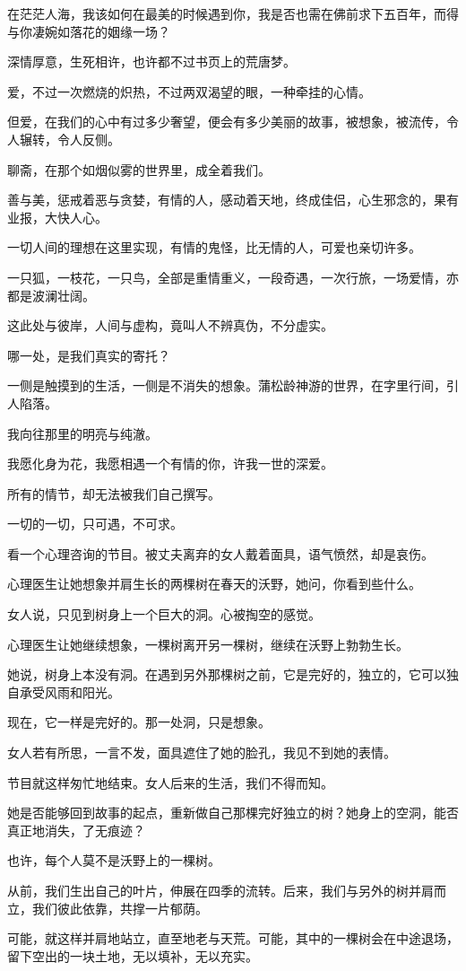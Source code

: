 		\vspace{1em}
		在茫茫人海，我该如何在最美的时候遇到你，我是否也需在佛前求下五百年，而得与你凄婉如落花的姻缘一场？\par
		深情厚意，生死相许，也许都不过书页上的荒唐梦。\par
		爱，不过一次燃烧的炽热，不过两双渴望的眼，一种牵挂的心情。\par
		但爱，在我们的心中有过多少奢望，便会有多少美丽的故事，被想象，被流传，令人辗转，令人反侧。\par
		聊斋，在那个如烟似雾的世界里，成全着我们。\par
		善与美，惩戒着恶与贪婪，有情的人，感动着天地，终成佳侣，心生邪念的，果有业报，大快人心。\par
		一切人间的理想在这里实现，有情的鬼怪，比无情的人，可爱也亲切许多。\par
		一只狐，一枝花，一只鸟，全部是重情重义，一段奇遇，一次行旅，一场爱情，亦都是波澜壮阔。\par
		这此处与彼岸，人间与虚构，竟叫人不辨真伪，不分虚实。\par
		哪一处，是我们真实的寄托？\par
		一侧是触摸到的生活，一侧是不消失的想象。蒲松龄神游的世界，在字里行间，引人陷落。\par
		我向往那里的明亮与纯澈。\par
		我愿化身为花，我愿相遇一个有情的你，许我一世的深爱。\par
		所有的情节，却无法被我们自己撰写。\par
		一切的一切，只可遇，不可求。

	\endwriting



		看一个心理咨询的节目。被丈夫离弃的女人戴着面具，语气愤然，却是哀伤。

		心理医生让她想象并肩生长的两棵树在春天的沃野，她问，你看到些什么。\par
		女人说，只见到树身上一个巨大的洞。心被掏空的感觉。\par
		心理医生让她继续想象，一棵树离开另一棵树，继续在沃野上勃勃生长。\par
		她说，树身上本没有洞。在遇到另外那棵树之前，它是完好的，独立的，它可以独自承受风雨和阳光。\par
		现在，它一样是完好的。那一处洞，只是想象。

		女人若有所思，一言不发，面具遮住了她的脸孔，我见不到她的表情。\par
		节目就这样匆忙地结束。女人后来的生活，我们不得而知。\par
		她是否能够回到故事的起点，重新做自己那棵完好独立的树？她身上的空洞，能否真正地消失，了无痕迹？\par
		也许，每个人莫不是沃野上的一棵树。\par
		从前，我们生出自己的叶片，伸展在四季的流转。后来，我们与另外的树并肩而立，我们彼此依靠，共撑一片郁荫。\par
		可能，就这样并肩地站立，直至地老与天荒。可能，其中的一棵树会在中途退场，留下空出的一块土地，无以填补，无以充实。

